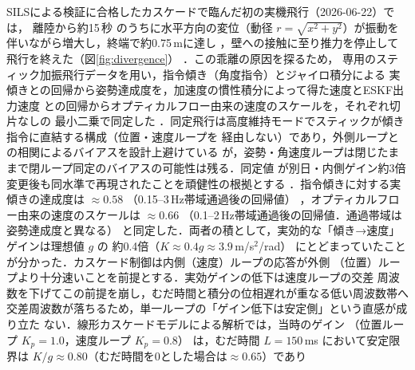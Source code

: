 \documentclass[a4paper,twocolumn,10pt]{ltjsarticle}
\begin{document}
SILSによる検証に合格したカスケードで臨んだ初の実機飛行（2026-06-22）では，
離陸から約15\,秒%
のうちに水平方向の変位（動径 $r=\sqrt{x^2+y^2}$）が振動を伴いながら増大し，終端で約0.75\,mに達し%
，壁への接触に至り推力を停止して飛行を終えた（図\ref{fig:divergence}）
．この乖離の原因を探るため，
専用のスティック加振飛行データを用い，指令傾き（角度指令）とジャイロ積分による
実傾きとの回帰から姿勢達成度を，加速度の慣性積分によって得た速度とESKF出力速度
との回帰からオプティカルフロー由来の速度のスケールを，それぞれ切片なしの
最小二乗で同定した%
．同定飛行は高度維持モードでスティックが傾き指令に直結する構成（位置・速度ループを
経由しない）であり，外側ループとの相関によるバイアスを設計上避けている
が，姿勢・角速度ループは閉じたままで閉ループ同定のバイアスの可能性は残る．同定値
が別日・内側ゲイン約3倍変更後も同水準で再現されたことを頑健性の根拠とする
．指令傾きに対する実傾きの達成度は
$\approx 0.58$%
（0.15--3\,Hz帯域通過後の回帰値）%
，オプティカルフロー由来の速度のスケールは $\approx 0.66$%
（0.1--2\,Hz帯域通過後の回帰値．通過帯域は姿勢達成度と異なる）%
と同定した．両者の積として，実効的な「傾き→速度」ゲインは理想値 $g$ の
約0.4倍（$K\approx 0.4g\approx 3.9$\,m/s$^2$/rad）%
にとどまっていたことが分かった．カスケード制御は内側（速度）ループの応答が外側
（位置）ループより十分速いことを前提とする．実効ゲインの低下は速度ループの交差
周波数を下げてこの前提を崩し，むだ時間と積分の位相遅れが重なる低い周波数帯へ
交差周波数が落ちるため，単一ループの「ゲイン低下は安定側」という直感が成り立た
ない．線形カスケードモデルによる解析では，当時のゲイン
（位置ループ $K_p=1.0$，速度ループ $K_p=0.8$）%
は，むだ時間 $L=150$\,ms%
において安定限界は $K/g\approx0.80$（むだ時間を0とした場合は$\approx0.65$）であり%
\end{document}
